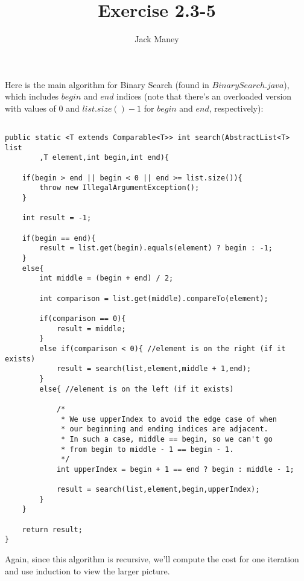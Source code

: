 \documentclass{article}
\begin{document}
\title{Exercise 2.3-5}
\author{Jack Maney}
\maketitle

Here is the main algorithm for Binary Search (found in $BinarySearch.java$), which includes $begin$ and $end$ indices (note that there's an overloaded version with values of 0 and $list.size() - 1$ for $begin$ and $end$, respectively):

\begin{verbatim}

public static <T extends Comparable<T>> int search(AbstractList<T> list
		,T element,int begin,int end){
		
	if(begin > end || begin < 0 || end >= list.size()){
		throw new IllegalArgumentException();
	}
	
	int result = -1;
	
	if(begin == end){
		result = list.get(begin).equals(element) ? begin : -1;
	}
	else{
		int middle = (begin + end) / 2;
		
		int comparison = list.get(middle).compareTo(element);
		
		if(comparison == 0){
			result = middle;
		}
		else if(comparison < 0){ //element is on the right (if it exists)
			result = search(list,element,middle + 1,end);
		}
		else{ //element is on the left (if it exists)
			
			/*
			 * We use upperIndex to avoid the edge case of when
			 * our beginning and ending indices are adjacent.
			 * In such a case, middle == begin, so we can't go
			 * from begin to middle - 1 == begin - 1.
			 */
			int upperIndex = begin + 1 == end ? begin : middle - 1;
			
			result = search(list,element,begin,upperIndex);
		}
	}
	
	return result;
}

\end{verbatim}


Again, since this algorithm is recursive, we'll compute the cost for one iteration and use induction to view the larger picture.

\bigskip
\end{document}
